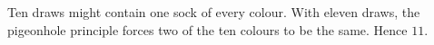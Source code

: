 Ten draws might contain one sock of every colour. With eleven draws, the pigeonhole principle forces two of the ten colours to be the same. Hence $\boxed{11}$.
